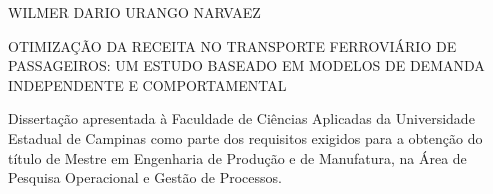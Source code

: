 





\thispagestyle{empty}


\begin{center}
	\large WILMER DARIO URANGO NARVAEZ
\end{center}

\vspace{3cm}

\begin{center}
	\large OTIMIZAÇÃO DA RECEITA NO TRANSPORTE FERROVIÁRIO DE PASSAGEIROS: UM ESTUDO BASEADO EM MODELOS DE DEMANDA INDEPENDENTE E COMPORTAMENTAL
\end{center}


\vspace{3cm}

\begin{flushright}
	\begin{minipage}{9.0cm}
		Dissertação apresentada à Faculdade de Ciências Aplicadas da Universidade Estadual de Campinas como parte dos requisitos exigidos para a obtenção do título de Mestre em Engenharia de Produção e de Manufatura, na Área de Pesquisa Operacional e Gestão de Processos.
	\end{minipage}
\end{flushright}

